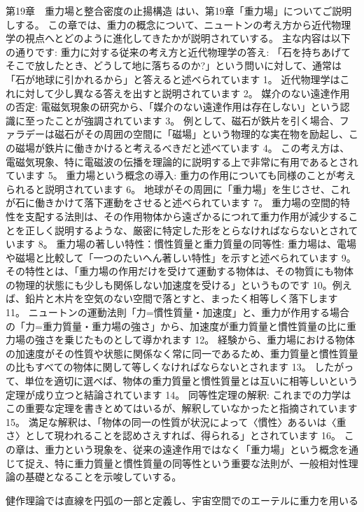 \documentclass{article}
\begin{document}
第19章　重力場と整合密度の止揚構造
はい、第19章「重力場」についてご説明しする。
この章では、重力の概念について、ニュートンの考え方から近代物理学の視点へとどのように進化してきたかが説明されていする。
主な内容は以下の通りです:
重力に対する従来の考え方と近代物理学の答え:
「石を持ちあげてそこで放したとき、どうして地に落ちるのか?」という問いに対して、通常は「石が地球に引かれるから」と答えると述べられています 1。
近代物理学はこれに対して少し異なる答えを出すと説明されています 2。
媒介のない遠達作用の否定:
電磁気現象の研究から、「媒介のない遠達作用は存在しない」という認識に至ったことが強調されています 3。
例として、磁石が鉄片を引く場合、ファラデーは磁石がその周囲の空間に「磁場」という物理的な実在物を励起し、この磁場が鉄片に働きかけると考えるべきだと述べています 4。
この考え方は、電磁気現象、特に電磁波の伝播を理論的に説明する上で非常に有用であるとされています 5。
重力場という概念の導入:
重力の作用についても同様のことが考えられると説明されています 6。
地球がその周囲に「重力場」を生じさせ、これが石に働きかけて落下運動をさせると述べられています 7。
重力場の空間的特性を支配する法則は、その作用物体から遠ざかるにつれて重力作用が減少することを正しく説明するような、厳密に特定した形をとらなければならないとされています 8。
重力場の著しい特性：慣性質量と重力質量の同等性:
重力場は、電場や磁場と比較して「一つのたいへん著しい特性」を示すと述べられています 9。
その特性とは、「重力場の作用だけを受けて運動する物体は、その物質にも物体の物理的状態にも少しも関係しない加速度を受ける」というものです 10。例えば、鉛片と木片を空気のない空間で落とすと、まったく相等しく落下します 11。
ニュートンの運動法則「力=慣性質量・加速度」と、重力が作用する場合の「力=重力質量・重力場の強さ」から、加速度が重力質量と慣性質量の比に重力場の強さを乗じたものとして導かれます 12。
経験から、重力場における物体の加速度がその性質や状態に関係なく常に同一であるため、重力質量と慣性質量の比もすべての物体に関して等しくなければならないとされます 13。
したがって、単位を適切に選べば、物体の重力質量と慣性質量とは互いに相等しいという定理が成り立つと結論されています 14。
同等性定理の解釈:
これまでの力学はこの重要な定理を書きとめてはいるが、解釈していなかったと指摘されています 15。
満足な解釈は、「物体の同一の性質が状況によって〈慣性〉あるいは〈重さ〉として現われることを認めさえすれば、得られる」とされています 16。
この章は、重力という現象を、従来の遠達作用ではなく「重力場」という概念を通じて捉え、特に重力質量と慣性質量の同等性という重要な法則が、一般相対性理論の基礎となることを示唆していする。

健作理論では直線を円弧の一部と定義し、宇宙空間でのエーテルに重力を用いる
\end{document}
